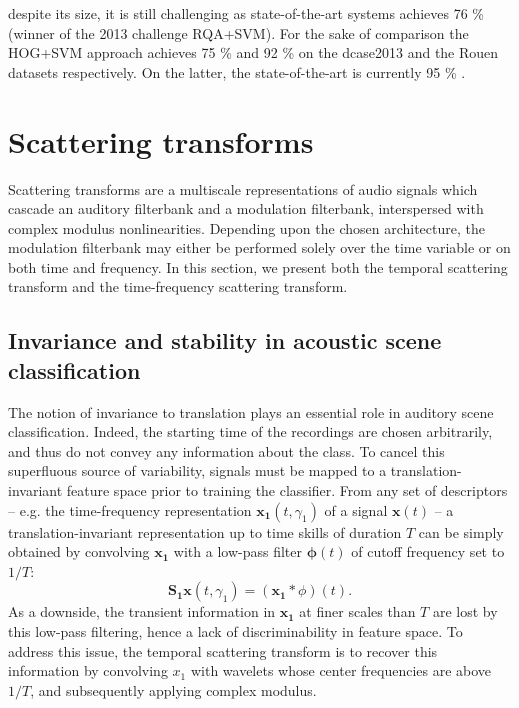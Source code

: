 \documentclass[journal]{IEEEtran}
\makeatletter
\newcommand*{\eg}{e.g.\@\xspace}
\makeatother
\begin{document}
despite its size, it is still challenging as state-of-the-art systems achieves 76 \% \cite{6701890} (winner of the 2013 challenge RQA+SVM). For the sake of comparison the HOG+SVM approach \cite{rakotomamonjy2015histogram} achieves 75 \% and 92 \% on the dcase2013 and the Rouen datasets respectively. On the latter, the state-of-the-art is currently 95 \% \cite{bisot2016acoustic}.

\section{Scattering transforms}
Scattering transforms are a multiscale representations of audio signals which cascade an auditory filterbank and a modulation filterbank, interspersed with complex modulus nonlinearities.
Depending upon the chosen architecture, the modulation filterbank may either be performed solely over the time variable or on both time and frequency.
In this section, we present both the temporal scattering transform and the time-frequency scattering transform.

\subsection{Invariance and stability in acoustic scene classification}
The notion of invariance to translation plays an essential role in auditory scene classification.
Indeed, the starting time of the recordings are chosen arbitrarily, and thus do not convey any information about the class.
To cancel this superfluous source of variability, signals must be mapped to a translation-invariant feature space prior to training the classifier.
From any set of descriptors -- \eg the time-frequency representation $\boldsymbol{x_1}(t,\gamma_1)$ of  a signal $\boldsymbol{x}(t)$ --
a translation-invariant representation up to time skills of duration $T$ can be simply obtained
by convolving $\boldsymbol{x_1}$ with a low-pass filter $\boldsymbol{\phi}(t)$ of cutoff frequency
set to $1/T$:
\begin{equation}
\mathbf{S_1}\boldsymbol{x}(t, \gamma_1) = (\boldsymbol{x_1} \ast \phi) (t).
\end{equation}
As a downside, the transient information in $\boldsymbol{x_1}$ at finer scales than $T$ are lost by this low-pass filtering, hence a lack of discriminability in feature space.
To address this issue, the temporal scattering transform is to recover this information by convolving $x_1$ with wavelets whose center frequencies are above $1/T$, and subsequently applying complex modulus.
\end{document}
